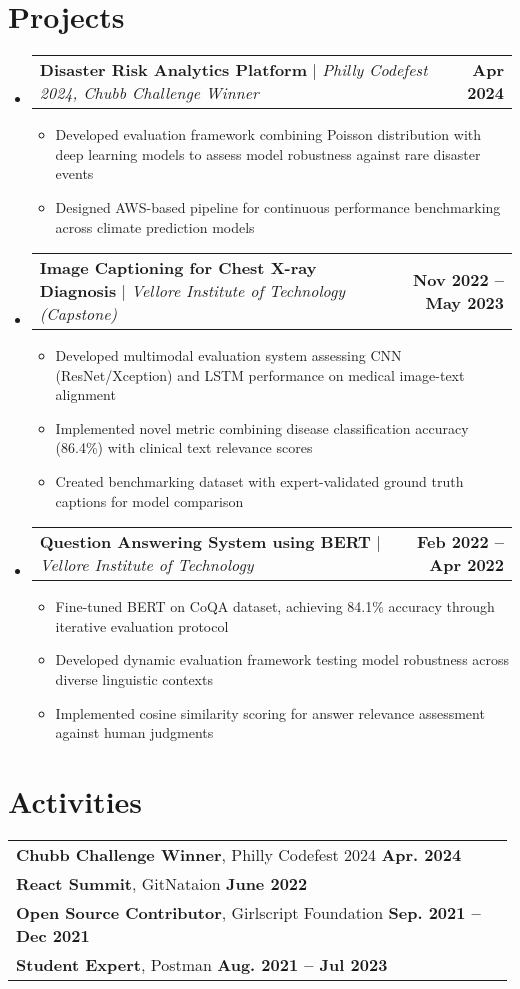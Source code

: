 \documentclass[letterpaper,11pt]{article}
\makeatletter
\newcommand{\resumeItem}[1]{
  \item\small{
    {#1 \vspace{-2pt}}
  }
}
\newcommand{\resumeProjectHeading}[2]{
    \item
    \begin{tabular*}{1.001\textwidth}{l@{\extracolsep{\fill}}r}
      \small#1 & \textbf{\small #2}\\
    \end{tabular*}\vspace{-3pt}
}
\newcommand{\resumeSubHeadingListStart}{\begin{itemize}[leftmargin=0.0in, label={}]}
\newcommand{\resumeSubHeadingListEnd}{\end{itemize}}
\newcommand{\resumeItemListStart}{\begin{itemize}}
\newcommand{\resumeItemListEnd}{\end{itemize}\vspace{-5pt}}
\makeatother
\begin{document}
\section{Projects}
\vspace{-5pt}
\resumeSubHeadingListStart
    \resumeProjectHeading
    {\textbf{Disaster Risk Analytics Platform} $|$ \emph{Philly Codefest 2024, Chubb Challenge Winner}} {Apr 2024}
    \resumeItemListStart
        \resumeItem{Developed evaluation framework combining Poisson distribution with deep learning models to assess model robustness against rare disaster events}
        \resumeItem{Designed AWS-based pipeline for continuous performance benchmarking across climate prediction models}
    \resumeItemListEnd
    \vspace{-18pt}
    \resumeProjectHeading
    {\textbf{Image Captioning for Chest X-ray Diagnosis} $|$ \emph{Vellore Institute of Technology (Capstone)}} {Nov 2022 -- May 2023}
    \resumeItemListStart
        \resumeItem{Developed multimodal evaluation system assessing CNN (ResNet/Xception) and LSTM performance on medical image-text alignment}
        \resumeItem{Implemented novel metric combining disease classification accuracy (86.4\%) with clinical text relevance scores}
        \resumeItem{Created benchmarking dataset with expert-validated ground truth captions for model comparison}
    \resumeItemListEnd
    \vspace{-18pt}
    \resumeProjectHeading
    {\textbf{Question Answering System using BERT} $|$ \emph{Vellore Institute of Technology}} {Feb 2022 -- Apr 2022}
    \resumeItemListStart
        \resumeItem{Fine-tuned BERT on CoQA dataset, achieving 84.1\% accuracy through iterative evaluation protocol}
        \resumeItem{Developed dynamic evaluation framework testing model robustness across diverse linguistic contexts}
        \resumeItem{Implemented cosine similarity scoring for answer relevance assessment against human judgments}
    \resumeItemListEnd
\resumeSubHeadingListEnd
\vspace{-15pt}
\section{Activities}
\begin{tabular}{p{0.99\linewidth}}
    \hspace{0.15in}\textbf{Chubb Challenge Winner}, Philly Codefest 2024
        \hfill \textbf{Apr. 2024} \\
            \hspace{0.15in}\textbf{React Summit}, GitNataion
        \hfill \textbf{June 2022}\\
    \hspace{0.15in}\textbf{Open Source Contributor}, Girlscript Foundation
        \hfill \textbf{Sep. 2021 -- Dec 2021}\\
    \hspace{0.15in}\textbf{Student Expert}, Postman
        \hfill \textbf{Aug. 2021 -- Jul 2023} 
\end{tabular}
\vspace{-15pt}
\end{document}
